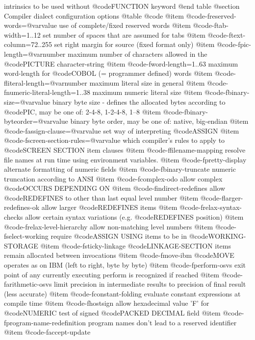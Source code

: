 intrinsics to be used without @code{FUNCTION} keyword
@end table
@section Compiler dialect configuration options
@table @code
@item @code{-freserved-words=@var{value}}
use of complete/fixed reserved words
@item @code{-ftab-width=1..12}
set number of spaces that are assumed for tabs
@item @code{-ftext-column=72..255}
set right margin for source (fixed format only)
@item @code{-fpic-length=@var{number}}
maximum number of characters allowed in the @code{PICTURE} character-string
@item @code{-fword-length=1..63}
maximum word-length for @code{COBOL} (= programmer defined) words
@item @code{-fliteral-length=@var{number}}
maximum literal size in general
@item @code{-fnumeric-literal-length=1..38}
maximum numeric literal size
@item @code{-fbinary-size=@var{value}}
binary byte size - defines the allocated bytes according to @code{PIC}, may be one of: 2-4-8, 1-2-4-8, 1--8
@item @code{-fbinary-byteorder=@var{value}}
binary byte order, may be one of: native, big-endian
@item @code{-fassign-clause=@var{value}}
set way of interpreting @code{ASSIGN}
@item @code{-fscreen-section-rules=@var{value}}
which compiler's rules to apply to @code{SCREEN SECTION} item clauses
@item @code{-ffilename-mapping}
resolve file names at run time using environment variables.
@item @code{-fpretty-display}
alternate formatting of numeric fields
@item @code{-fbinary-truncate}
numeric truncation according to ANSI
@item @code{-fcomplex-odo}
allow complex @code{OCCURS DEPENDING ON}
@item @code{-findirect-redefines}
allow @code{REDEFINES} to other than last equal level number
@item @code{-flarger-redefines-ok}
allow larger @code{REDEFINES} items
@item @code{-frelax-syntax-checks}
allow certain syntax variations (e.g. @code{REDEFINES} position)
@item @code{-frelax-level-hierarchy}
allow non-matching level numbers
@item @code{-fselect-working}
require @code{ASSIGN USING} items to be in @code{WORKING-STORAGE}
@item @code{-fsticky-linkage}
@code{LINKAGE-SECTION} items remain allocated between invocations
@item @code{-fmove-ibm}
@code{MOVE} operates as on IBM (left to right, byte by byte)
@item @code{-fperform-osvs}
exit point of any currently executing perform is recognized if reached
@item @code{-farithmetic-osvs}
limit precision in intermediate results to precision of final result (less accurate)
@item @code{-fconstant-folding}
evaluate constant expressions at compile time
@item @code{-fhostsign}
allow hexadecimal value 'F' for @code{NUMERIC} test of signed @code{PACKED DECIMAL} field
@item @code{-fprogram-name-redefinition}
program names don't lead to a reserved identifier
@item @code{-faccept-update}
